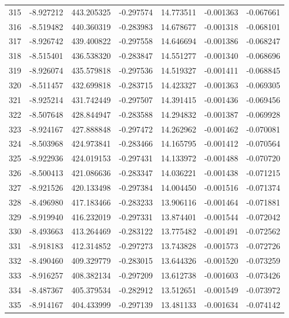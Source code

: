\begin{tabular}{rrrrrrr}
 315 &  -8.927212 &  443.205325 & -0.297574 &  14.773511 &  -0.001363 & -0.067661 \\
 316 &  -8.519482 &  440.360319 & -0.283983 &  14.678677 &  -0.001318 & -0.068101 \\
 317 &  -8.926742 &  439.400822 & -0.297558 &  14.646694 &  -0.001386 & -0.068247 \\
 318 &  -8.515401 &  436.538320 & -0.283847 &  14.551277 &  -0.001340 & -0.068696 \\
 319 &  -8.926074 &  435.579818 & -0.297536 &  14.519327 &  -0.001411 & -0.068845 \\
 320 &  -8.511457 &  432.699818 & -0.283715 &  14.423327 &  -0.001363 & -0.069305 \\
 321 &  -8.925214 &  431.742449 & -0.297507 &  14.391415 &  -0.001436 & -0.069456 \\
 322 &  -8.507648 &  428.844947 & -0.283588 &  14.294832 &  -0.001387 & -0.069928 \\
 323 &  -8.924167 &  427.888848 & -0.297472 &  14.262962 &  -0.001462 & -0.070081 \\
 324 &  -8.503968 &  424.973841 & -0.283466 &  14.165795 &  -0.001412 & -0.070564 \\
 325 &  -8.922936 &  424.019153 & -0.297431 &  14.133972 &  -0.001488 & -0.070720 \\
 326 &  -8.500413 &  421.086636 & -0.283347 &  14.036221 &  -0.001438 & -0.071215 \\
 327 &  -8.921526 &  420.133498 & -0.297384 &  14.004450 &  -0.001516 & -0.071374 \\
 328 &  -8.496980 &  417.183466 & -0.283233 &  13.906116 &  -0.001464 & -0.071881 \\
 329 &  -8.919940 &  416.232019 & -0.297331 &  13.874401 &  -0.001544 & -0.072042 \\
 330 &  -8.493663 &  413.264469 & -0.283122 &  13.775482 &  -0.001491 & -0.072562 \\
 331 &  -8.918183 &  412.314852 & -0.297273 &  13.743828 &  -0.001573 & -0.072726 \\
 332 &  -8.490460 &  409.329779 & -0.283015 &  13.644326 &  -0.001520 & -0.073259 \\
 333 &  -8.916257 &  408.382134 & -0.297209 &  13.612738 &  -0.001603 & -0.073426 \\
 334 &  -8.487367 &  405.379534 & -0.282912 &  13.512651 &  -0.001549 & -0.073972 \\
 335 &  -8.914167 &  404.433999 & -0.297139 &  13.481133 &  -0.001634 & -0.074142 \\

\end{tabular}
